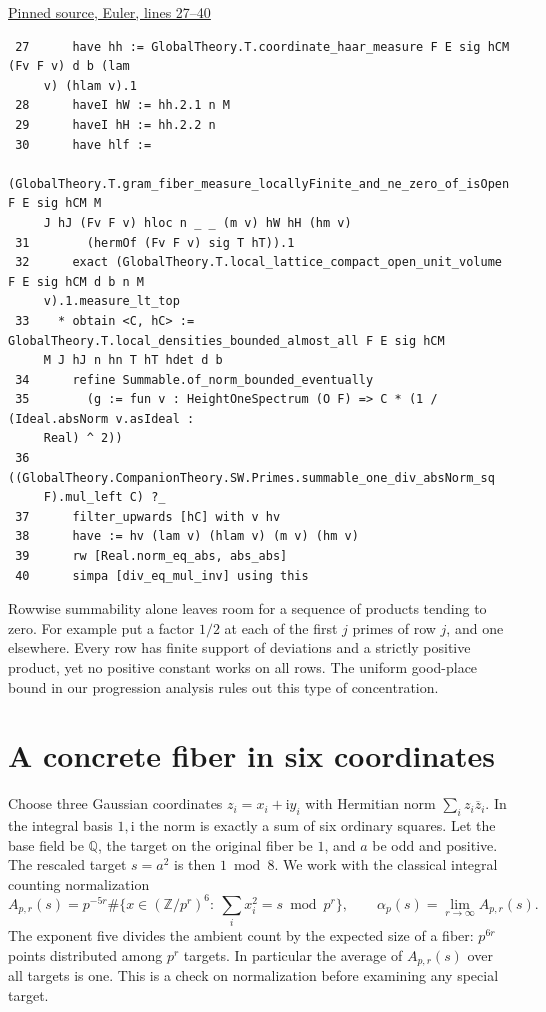 \documentclass[12pt,letterpaper]{article}
\begin{document}
\par\smallskip\href{https://github.com/nousentllc/riemann-hypothesis/blob/40e56bab026552e089d7afcfeff08d2defb9c005/src/CompanionTheory/SpectralGeometry/LocalGlobalProofs/AdelicAnalysis/EulerProductLocalDensitiesConverges.lean#L27-L40}{\sffamily\small Pinned source, Euler, lines 27--40}\par

{\footnotesize\begin{verbatim}
 27      have hh := GlobalTheory.T.coordinate_haar_measure F E sig hCM (Fv F v) d b (lam
     v) (hlam v).1
 28      haveI hW := hh.2.1 n M
 29      haveI hH := hh.2.2 n
 30      have hlf :=
     (GlobalTheory.T.gram_fiber_measure_locallyFinite_and_ne_zero_of_isOpen F E sig hCM M
     J hJ (Fv F v) hloc n _ _ (m v) hW hH (hm v)
 31        (hermOf (Fv F v) sig T hT)).1
 32      exact (GlobalTheory.T.local_lattice_compact_open_unit_volume F E sig hCM d b n M
     v).1.measure_lt_top
 33    * obtain <C, hC> := GlobalTheory.T.local_densities_bounded_almost_all F E sig hCM
     M J hJ n hn T hT hdet d b
 34      refine Summable.of_norm_bounded_eventually
 35        (g := fun v : HeightOneSpectrum (O F) => C * (1 / (Ideal.absNorm v.asIdeal :
     Real) ^ 2))
 36        ((GlobalTheory.CompanionTheory.SW.Primes.summable_one_div_absNorm_sq
     F).mul_left C) ?_
 37      filter_upwards [hC] with v hv
 38      have := hv (lam v) (hlam v) (m v) (hm v)
 39      rw [Real.norm_eq_abs, abs_abs]
 40      simpa [div_eq_mul_inv] using this
\end{verbatim}
}

Rowwise summability alone leaves room for a sequence of products tending to zero. For example put a factor \(1/2\) at each of the first \(j\) primes of row \(j\), and one elsewhere. Every row has finite support of deviations and a strictly positive product, yet no positive constant works on all rows. The uniform good-place bound in our progression analysis rules out this type of concentration.

\clearpage\section{A concrete fiber in six coordinates}\label{six}
Choose three Gaussian coordinates \(z_i=x_i+\mathrm i y_i\) with Hermitian norm \(\sum_i z_i\overline z_i\). In the integral basis \(1,\mathrm i\) the norm is exactly a sum of six ordinary squares. Let the base field be \(\mathbb Q\), the target on the original fiber be \(1\), and \(a\) be odd and positive. The rescaled target \(s=a^2\) is then \(1\bmod8\). We work with the classical integral counting normalization
\[
 A_{p,r}(s)=p^{-5r}
 \#\{x\in(\mathbb Z/p^r)^6:\ \textstyle\sum_i x_i^2=s\bmod p^r\},
 \qquad \alpha_p(s)=\lim_{r\to\infty}A_{p,r}(s).
\]
The exponent five divides the ambient count by the expected size of a fiber: \(p^{6r}\) points distributed among \(p^r\) targets. In particular the average of \(A_{p,r}(s)\) over all targets is one. This is a check on normalization before examining any special target.
\end{document}
